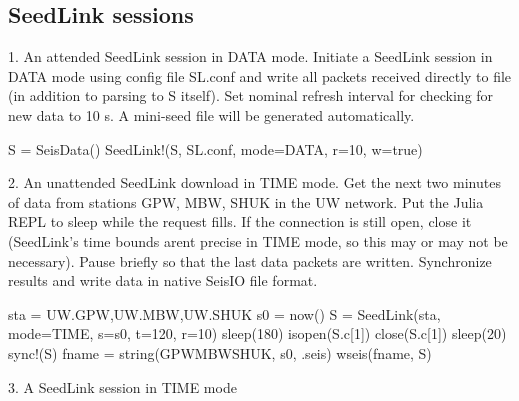\documentclass[letterpaper,11pt,english]{sphinxmanual}
\begin{document}
\subsection{SeedLink sessions}
\label{\detokenize{src/Appendices/examples:seedlink-sessions}}
1. An attended SeedLink session in DATA mode. Initiate a SeedLink session in DATA mode using config file SL.conf and write all packets received directly to file (in addition to parsing to S itself). Set nominal refresh interval for checking for new data to 10 s. A mini-seed file will be generated automatically.

%
\begin{sphinxVerbatim}[commandchars=\\\{\}]
S = SeisData()
SeedLink!(S, \PYGZdq{}SL.conf\PYGZdq{}, mode=\PYGZdq{}DATA\PYGZdq{}, r=10, w=true)
\end{sphinxVerbatim}

2. An unattended SeedLink download in TIME mode. Get the next two minutes of data from stations GPW, MBW, SHUK in the UW network. Put the Julia REPL to sleep while the request fills. If the connection is still open, close it (SeedLink’s time bounds arent precise in TIME mode, so this may or may not be necessary). Pause briefly so that the last data packets are written. Synchronize results and write data in native SeisIO file format.

%
\begin{sphinxVerbatim}[commandchars=\\\{\}]
sta = \PYGZdq{}UW.GPW,UW.MBW,UW.SHUK\PYGZdq{}
s0 = now()
S = SeedLink(sta, mode=\PYGZdq{}TIME\PYGZdq{}, s=s0, t=120, r=10)
sleep(180)
isopen(S.c[1]) \PYGZam{}\PYGZam{} close(S.c[1])
sleep(20)
sync!(S)
fname = string(\PYGZdq{}GPW\PYGZus{}MBW\PYGZus{}SHUK\PYGZdq{}, s0, \PYGZdq{}.seis\PYGZdq{})
wseis(fname, S)
\end{sphinxVerbatim}

3. A SeedLink session in TIME mode

%
\begin{sphinxVerbatim}[commandchars=\\\{\}]
  
     
\end{sphinxVerbatim}
\end{document}
